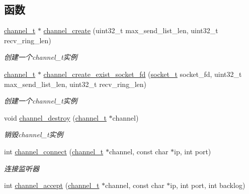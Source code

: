 \subsection*{函数}
\begin{DoxyCompactItemize}
\item 
\hyperlink{a00047_a2effb3e20d0b7e5f6d5ac42118e0330b_a2effb3e20d0b7e5f6d5ac42118e0330b}{channel\+\_\+t} $\ast$ \hyperlink{a00042_ac2250584fc8b99ed26a4bbe4750cce61_ac2250584fc8b99ed26a4bbe4750cce61}{channel\+\_\+create} (uint32\+\_\+t max\+\_\+send\+\_\+list\+\_\+len, uint32\+\_\+t recv\+\_\+ring\+\_\+len)
\begin{DoxyCompactList}\small\item\em 创建一个channel\+\_\+t实例 \end{DoxyCompactList}\item 
\hyperlink{a00047_a2effb3e20d0b7e5f6d5ac42118e0330b_a2effb3e20d0b7e5f6d5ac42118e0330b}{channel\+\_\+t} $\ast$ \hyperlink{a00042_a9fe31ed96008befaf02f50568b59a199_a9fe31ed96008befaf02f50568b59a199}{channel\+\_\+create\+\_\+exist\+\_\+socket\+\_\+fd} (\hyperlink{a00047_a0d9e0afbf02fb6ed6c5b1415dce51b05_a0d9e0afbf02fb6ed6c5b1415dce51b05}{socket\+\_\+t} socket\+\_\+fd, uint32\+\_\+t max\+\_\+send\+\_\+list\+\_\+len, uint32\+\_\+t recv\+\_\+ring\+\_\+len)
\begin{DoxyCompactList}\small\item\em 创建一个channel\+\_\+t实例 \end{DoxyCompactList}\item 
void \hyperlink{a00042_ad7e93c006b66c9fa049a4233840cda05_ad7e93c006b66c9fa049a4233840cda05}{channel\+\_\+destroy} (\hyperlink{a00047_a2effb3e20d0b7e5f6d5ac42118e0330b_a2effb3e20d0b7e5f6d5ac42118e0330b}{channel\+\_\+t} $\ast$channel)
\begin{DoxyCompactList}\small\item\em 销毁channel\+\_\+t实例 \end{DoxyCompactList}\item 
int \hyperlink{a00042_a86caf9eb37ca45a77045cc5e10018afb_a86caf9eb37ca45a77045cc5e10018afb}{channel\+\_\+connect} (\hyperlink{a00047_a2effb3e20d0b7e5f6d5ac42118e0330b_a2effb3e20d0b7e5f6d5ac42118e0330b}{channel\+\_\+t} $\ast$channel, const char $\ast$ip, int port)
\begin{DoxyCompactList}\small\item\em 连接监听器 \end{DoxyCompactList}\item 
int \hyperlink{a00042_a8345afe1fa7e60dd9b12304809a96a7e_a8345afe1fa7e60dd9b12304809a96a7e}{channel\+\_\+accept} (\hyperlink{a00047_a2effb3e20d0b7e5f6d5ac42118e0330b_a2effb3e20d0b7e5f6d5ac42118e0330b}{channel\+\_\+t} $\ast$channel, const char $\ast$ip, int port, int backlog)

\end{DoxyCompactItemize}
